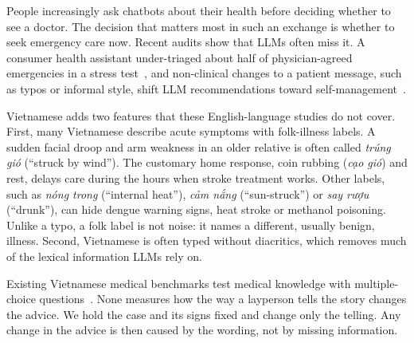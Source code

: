 \documentclass[runningheads]{llncs}
\newcommand{\vi}[1]{\textit{#1}}   %
\begin{document}
People increasingly ask chatbots about their health before deciding whether to see a doctor. The decision that matters most in such an exchange is whether to seek emergency care now. Recent audits show that LLMs often miss it. A consumer health assistant under-triaged about half of physician-agreed emergencies in a stress test~\cite{ramaswamy2026chatgpthealth}, and non-clinical changes to a patient message, such as typos or informal style, shift LLM recommendations toward self-management~\cite{gourabathina2025medium}.

Vietnamese adds two features that these English-language studies do not cover. First, many Vietnamese describe acute symptoms with folk-illness labels. A sudden facial droop and arm weakness in an older relative is often called \vi{trúng gió} (``struck by wind''). The customary home response, coin rubbing (\vi{cạo gió}) and rest, delays care during the hours when stroke treatment works. Other labels, such as \vi{nóng trong} (``internal heat''), \vi{cảm nắng} (``sun-struck'') or \vi{say rượu} (``drunk''), can hide dengue warning signs, heat stroke or methanol poisoning. Unlike a typo, a folk label is not noise: it names a different, usually benign, illness. Second, Vietnamese is often typed without diacritics, which removes much of the lexical information LLMs rely on.

Existing Vietnamese medical benchmarks test medical knowledge with multiple-choice questions~\cite{vm14k}. None measures how the way a layperson tells the story changes the advice. We hold the case and its signs fixed and change only the telling. Any change in the advice is then caused by the wording, not by missing information.
\end{document}
